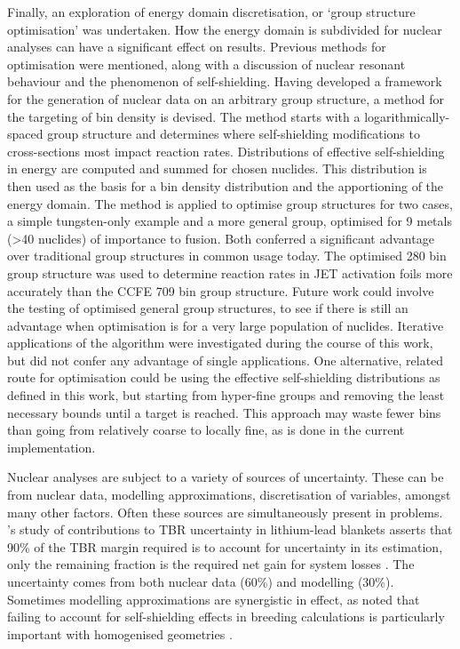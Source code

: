 Finally, an exploration of energy domain discretisation, or `group structure optimisation' was undertaken. How the energy domain is subdivided for nuclear analyses can have a significant effect on results. Previous methods for optimisation were mentioned, along with a discussion of nuclear resonant behaviour and the phenomenon of self-shielding. Having developed a framework for the generation of nuclear data on an arbitrary group structure, a method for the targeting of bin density is devised. The method starts with a logarithmically-spaced group structure and determines where self-shielding modifications to cross-sections most impact reaction rates. Distributions of effective self-shielding in energy are computed and summed for chosen nuclides. This distribution is then used as the basis for a bin density distribution and the apportioning of the energy domain. The method is applied to optimise group structures for two cases, a simple tungsten-only example and a more general group, optimised for 9 metals (>40 nuclides) of importance to fusion. Both conferred a significant advantage over traditional group structures in common usage today. The optimised 280 bin group structure was used to determine reaction rates in JET activation foils more accurately than the CCFE 709 bin group structure. Future work could involve the testing of optimised general group structures, to see if there is still an advantage when optimisation is for a very large population of nuclides. Iterative applications of the algorithm were investigated during the course of this work, but did not confer any advantage of single applications. One alternative, related route for optimisation could be using the effective self-shielding distributions as defined in this work, but starting from hyper-fine groups and removing the least necessary bounds until a target is reached. This approach may waste fewer bins than going from relatively coarse to locally fine, as is done in the current implementation.

Nuclear analyses are subject to a variety of sources of uncertainty. These can be from nuclear data, modelling approximations, discretisation of variables, amongst many other factors. Often these sources are simultaneously present in problems. \citeauthor{El-Guebaly2009}'s study of contributions to TBR uncertainty in lithium-lead blankets asserts that 90\% of the TBR margin required is to account for uncertainty in its estimation, only the remaining fraction is the required net gain for system losses \cite{El-Guebaly2009}. The uncertainty comes from both nuclear data (60\%) and modelling (30\%). Sometimes modelling approximations are synergistic in effect, as \citeauthor{Pelloni1989} noted that failing to account for self-shielding effects in breeding calculations is particularly important with homogenised geometries \cite{Pelloni1989}. 

